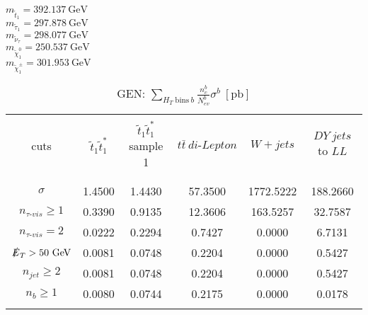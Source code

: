 \documentclass[12pt, a4paper]{article}
\begin{document}
$ m_{\tilde{t}_{1}} = 392.137 \ \text{GeV} $\\ 
$ m_{\tilde{\tau}_{1}} = 297.878 \ \text{GeV} $\\ 
$ m_{\tilde{\nu}_{\tau}} = 298.077 \ \text{GeV} $\\ 
$ m_{\tilde{\chi}^{0}_{1}} = 250.537 \ \text{GeV} $\\ 
$ m_{\tilde{\chi}^{\pm}_{1}} = 301.953 \ \text{GeV} $\\ 

\begin{table}[!ht]
\begin{center}
\begin{tabular}{| c | c | c | c | c | c |}
\hline
&&&&& \\
cuts & $ \tilde{t}_{1} \tilde{t}^{*}_{1} $ & $ \tilde{t}_{1} \tilde{t}^{*}_{1} $ sample 1 & $ t \bar{t} \  di \text{-} Lepton $ & $ W + jets $ & $ DY \ jets $ to $ LL $ \\
&&&&& \\
\hline
&&&&& \\
$ \sigma $ & 1.4500 & 1.4430 & 57.3500 & 1772.5222 & 188.2660 \\
$ n_{\tau \text{-} vis} \geqslant 1 $ & 0.3390 & 0.9135 & 12.3606 & 163.5257 & 32.7587 \\
$ n_{\tau \text{-} vis} = 2 $ & 0.0222 & 0.2294 & 0.7427 & 0.0000 & 6.7131 \\
$ \slashed{E}_T > 50 \ \text{GeV} $ & 0.0081 & 0.0748 & 0.2204 & 0.0000 & 0.5427 \\
$ n_{jet} \geqslant 2 $ & 0.0081 & 0.0748 & 0.2204 & 0.0000 & 0.5427 \\
$ n_{b} \geqslant 1 $ & 0.0080 & 0.0744 & 0.2175 & 0.0000 & 0.0178 \\
&&&&& \\
\hline
\end{tabular}
\end{center}
\caption{GEN: $ \sum\limits_{H_{T} \ \text{bins} \ b} \frac{n^{b}_{c}}{N^{b}_{ev}} \sigma^{b} \ [\text{pb}] $}
\label{}
\end{table}
\end{document}
